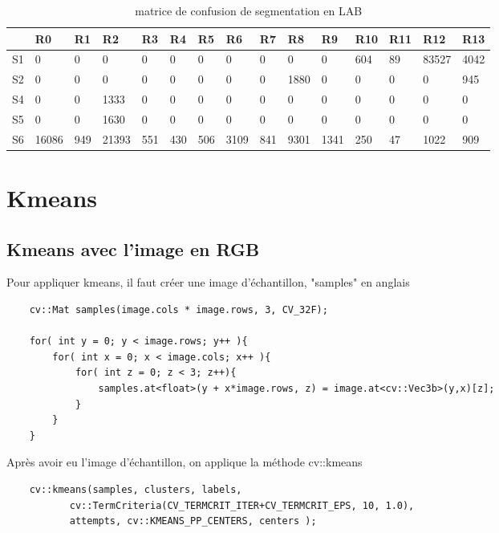 \documentclass[article=a4, fontsize=11pt]{scrartcl}	%
\begin{document}
\begin{table}[!ht]
	\begin{center}
	    \begin{tabular}{| l | l | l | l | l | l | l | l | l | l | l | l | l | l | l |}
	    	\hline
	    	  & R0 & R1 & R2 & R3 & R4 & R5 & R6 & R7 & R8 & R9 & R10 & R11 & R12 & R13\\
	    	\hline
	    	S1 & 0 & 0 & 0 & 0 & 0 & 0 & 0  & 0 & 0 & 0 & 604 & 89 & 83527 & 4042 \\
	    	\hline
	    	S2 & 0 & 0 & 0 & 0 & 0 & 0  & 0 & 0 & 1880 & 0 & 0 & 0 & 0 & 945 \\
	    	\hline
	    	S4 & 0 & 0 & 1333 & 0 & 0  & 0 & 0 & 0 & 0 & 0 & 0 & 0 & 0 & 0\\
	    	\hline
	    	S5 & 0 & 0 & 1630 & 0 & 0 & 0 & 0 & 0 & 0 & 0 & 0 & 0 & 0 & 0\\
	    	\hline	    	
	    	S6 & 16086 & 949 & 21393 & 551 & 430  & 506 & 3109 & 841 & 9301 & 1341  & 250 & 47 & 1022 & 909\\
	    	\hline	    	
	    \end{tabular}
	\end{center}
	\caption {matrice de confusion de segmentation en LAB}
\end{table}
\section{Kmeans}
\subsection{Kmeans avec l'image en RGB}
Pour appliquer kmeans, il faut créer une image d'échantillon,  "samples" en anglais
\begin{lstlisting}
    cv::Mat samples(image.cols * image.rows, 3, CV_32F);    
                                                                                                       
    for( int y = 0; y < image.rows; y++ ){
        for( int x = 0; x < image.cols; x++ ){
            for( int z = 0; z < 3; z++){
                samples.at<float>(y + x*image.rows, z) = image.at<cv::Vec3b>(y,x)[z];
            }
        }
    }
\end{lstlisting}

Après avoir eu l'image d'échantillon, on applique la méthode cv::kmeans
\begin{lstlisting}
    cv::kmeans(samples, clusters, labels,                                  
           cv::TermCriteria(CV_TERMCRIT_ITER+CV_TERMCRIT_EPS, 10, 1.0), 
           attempts, cv::KMEANS_PP_CENTERS, centers );  
\end{lstlisting}
\end{document}
